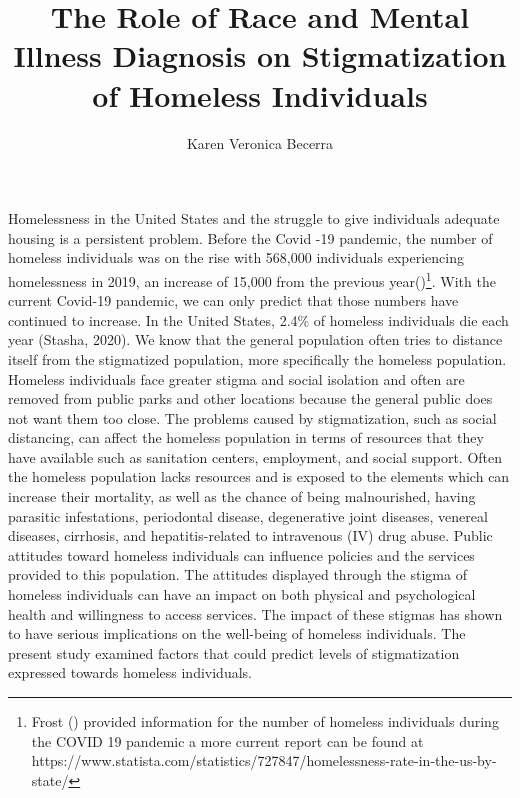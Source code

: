 \documentclass[
  man,
  floatsintext,
  longtable,
  nolmodern,
  notxfonts,
  notimes,
  colorlinks=true,linkcolor=blue,citecolor=blue,urlcolor=blue]{apa7}
\title{The Role of Race and Mental Illness Diagnosis on Stigmatization
of Homeless Individuals}
\author{Karen Veronica Becerra}
\affiliation{
{Department of Psychology, The University of Chicago}}
\begin{document}
\maketitle


\setcounter{secnumdepth}{-\maxdimen} %

\setlength\LTleft{0pt}


Homelessness in the United States and the struggle to give individuals
adequate housing is a persistent problem. Before the Covid -19 pandemic,
the number of homeless individuals was on the rise with 568,000
individuals experiencing homelessness in 2019, an increase of 15,000
from the previous
year()\footnote{Frost
  () provided
  information for the number of homeless individuals during the COVID 19
  pandemic a more current report can be found at
  https://www.statista.com/statistics/727847/homelessness-rate-in-the-us-by-state/}.
With the current Covid-19 pandemic, we can only predict that those
numbers have continued to increase. In the United States, 2.4\% of
homeless individuals die each year (Stasha, 2020). We know that the
general population often tries to distance itself from the stigmatized
population, more specifically the homeless population. Homeless
individuals face greater stigma and social isolation and often are
removed from public parks and other locations because the general public
does not want them too close. The problems caused by stigmatization,
such as social distancing, can affect the homeless population in terms
of resources that they have available such as sanitation centers,
employment, and social support. Often the homeless population lacks
resources and is exposed to the elements which can increase their
mortality, as well as the chance of being malnourished, having parasitic
infestations, periodontal disease, degenerative joint diseases, venereal
diseases, cirrhosis, and hepatitis-related to intravenous (IV) drug
abuse. Public attitudes toward homeless individuals can influence
policies and the services provided to this population. The attitudes
displayed through the stigma of homeless individuals can have an impact
on both physical and psychological health and willingness to access
services. The impact of these stigmas has shown to have serious
implications on the well-being of homeless individuals. The present
study examined factors that could predict levels of stigmatization
expressed towards homeless individuals.
\end{document}
